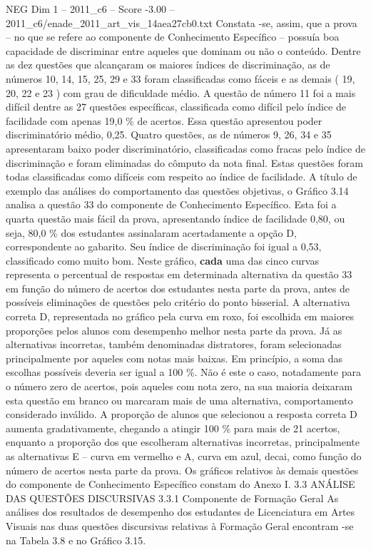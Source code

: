 \begin{textsample}{NEG Dim 1 – 2011\_c6 – Score -3.00 – 2011\_c6/enade\_2011\_art\_vis\_14aea27cb0.txt}
Constata -se, assim, que a prova – no que se refere ao componente de Conhecimento Específico – possuía boa capacidade de discriminar entre aqueles que dominam ou não o conteúdo.
Dentre as dez questões que alcançaram os maiores índices de discriminação, as de números 10, 14, 15, 25, 29 e 33 foram classificadas como fáceis e as demais ( 19, 20, 22 e 23 ) com grau de dificuldade médio.
A questão de número 11 foi a mais difícil dentre as 27 questões específicas, classificada como difícil pelo índice de facilidade com apenas 19,0 \% de acertos.
Essa questão apresentou poder discriminatório médio, 0,25.
Quatro questões, as de números 9, 26, 34 e 35 apresentaram baixo poder discriminatório, classificadas como fracas pelo índice de discriminação e foram eliminadas do cômputo da nota final.
Estas questões foram todas classificadas como difíceis com respeito ao índice de facilidade.
A título de exemplo das análises do comportamento das questões objetivas, o Gráfico 3.14 analisa a questão 33 do componente de Conhecimento Específico.
Esta foi a quarta questão mais fácil da prova, apresentando índice de facilidade 0,80, ou seja, 80,0 \% dos estudantes assinalaram acertadamente a opção D, correspondente ao gabarito.
Seu índice de discriminação foi igual a 0,53, classificado como muito bom.
Neste gráfico, \textbf{cada} uma das cinco curvas representa o percentual de respostas em determinada alternativa da questão 33 em função do número de acertos dos estudantes nesta parte da prova, antes de possíveis eliminações de questões pelo critério do ponto bisserial.
A alternativa correta D, representada no gráfico pela curva em roxo, foi escolhida em maiores proporções pelos alunos com desempenho melhor nesta parte da prova.
Já as alternativas incorretas, também denominadas distratores, foram selecionadas principalmente por aqueles com notas mais baixas.
Em princípio, a soma das escolhas possíveis deveria ser igual a 100 \%.
Não é este o caso, notadamente para o número zero de acertos, pois aqueles com nota zero, na sua maioria deixaram esta questão em branco ou marcaram mais de uma alternativa, comportamento considerado inválido.
A proporção de alunos que selecionou a resposta correta D aumenta gradativamente, chegando a atingir 100 \% para mais de 21 acertos, enquanto a proporção dos que escolheram alternativas incorretas, principalmente as alternativas E – curva em vermelho e A, curva em azul, decai, como função do número de acertos nesta parte da prova.
Os gráficos relativos às demais questões do componente de Conhecimento Específico constam do Anexo I. 3.3 ANÁLISE DAS QUESTÕES DISCURSIVAS 3.3.1 Componente de Formação Geral As análises dos resultados de desempenho dos estudantes de Licenciatura em Artes Visuais nas duas questões discursivas relativas à Formação Geral encontram -se na Tabela 3.8 e no Gráfico 3.15.

\end{textsample}
